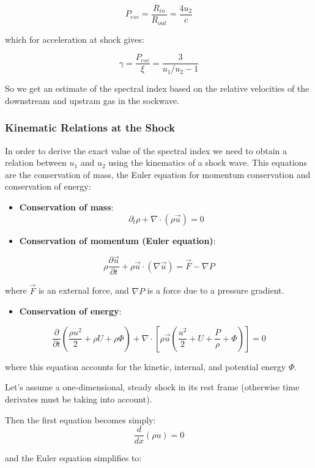 \documentclass[
  letterpaper,
  DIV=11,
  numbers=noendperiod]{scrreprt}
\providecommand{\tightlist}{%
  \setlength{\itemsep}{0pt}\setlength{\parskip}{0pt}}\usepackage{longtable,booktabs,array}
\begin{document}
\[P_{esc} = \frac{R_{in} }{R_{out} }= \frac{4 u_2}{c}\]

which for acceleration at shock gives:

\[\gamma = \frac{P_{esc}}{\xi} = \frac{3}{u_1/u_2 -1}\]

So we get an estimate of the spectral index based on the relative
velocities of the downstream and upstram gas in the sockwave.

\subsubsection{Kinematic Relations at the
Shock}\label{kinematic-relations-at-the-shock}

In order to derive the exact value of the spectral index we need to
obtain a relation between \(u_1\) and \(u_2\) using the kinematics of a
shock wave. This equations are the conservation of mass, the Euler
equation for momentum conservation and conservation of energy:

\begin{itemize}
\item
  \textbf{Conservation of mass}:
  \[\partial_t \rho + \nabla \cdot (\rho\vec{u}) = 0\]
\item
  \textbf{Conservation of momentum (Euler equation)}:
\end{itemize}

\[\rho\frac{\partial \vec{u}}{\partial t} + \rho \vec{u} \cdot(\nabla\vec{u}) = \vec{F} - \nabla P\]

where \(\vec{F}\) is an external force, and \(\nabla P\) is a force due
to a pressure gradient.

\begin{itemize}
\tightlist
\item
  \textbf{Conservation of energy}:
\end{itemize}

\[\frac{\partial}{\partial t} \left(\frac{\rho u^2}{2} + \rho U + \rho\Phi\right) + \nabla\cdot\left[\rho \vec{u}\left(\frac{u^2}{2} + U + \frac{P}{\rho} + \Phi\right)\right] = 0 \]

where this equation accounts for the kinetic, internal, and potential
energy \(\Phi\).

Let's assume a one-dimensional, steady shock in its rest frame
(otherwise time derivates must be taking into account).

Then the first equation becomes simply: \[\frac{d}{dx} (\rho u) = 0\]

and the Euler equation simplifies to:
\end{document}
